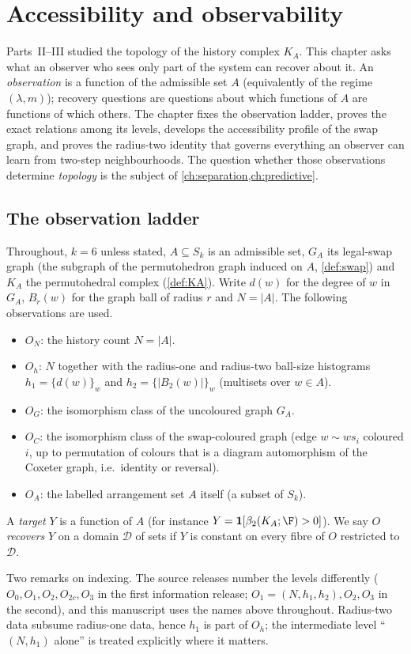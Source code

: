 \chapter{Accessibility and observability}\label{ch:access}

Parts~II--III studied the topology of the history complex $K_A$. This chapter asks what an observer who sees only part of the system can recover about it. An \emph{observation} is a function of the admissible set $A$ (equivalently of the regime $(\lambda,m)$); recovery questions are questions about which functions of $A$ are functions of which others. The chapter fixes the observation ladder, proves the exact relations among its levels, develops the accessibility profile of the swap graph, and proves the radius-two identity that governs everything an observer can learn from two-step neighbourhoods. The question whether those observations determine \emph{topology} is the subject of \cref{ch:separation,ch:predictive}.

\section{The observation ladder}\label{sec:ladder}
Throughout, $k=6$ unless stated, $A\subseteq S_k$ is an admissible set, $G_A$ its legal-swap graph (the subgraph of the permutohedron graph induced on $A$, \cref{def:swap}) and $K_A$ the permutohedral complex (\cref{def:KA}). Write $d(w)$ for the degree of $w$ in $G_A$, $B_r(w)$ for the graph ball of radius $r$ and $N=|A|$. The following observations are used.
\begin{definition}\label{def:ladder}
\begin{itemize}[nosep]
\item $O_N$: the history count $N=|A|$.
\item $O_h$: $N$ together with the radius-one and radius-two ball-size histograms $h_1=\{d(w)\}_w$ and $h_2=\{|B_2(w)|\}_w$ (multisets over $w\in A$).
\item $O_G$: the isomorphism class of the uncoloured graph $G_A$.
\item $O_C$: the isomorphism class of the swap-coloured graph (edge $w\sim ws_i$ coloured $i$, up to permutation of colours that is a diagram automorphism of the Coxeter graph, i.e.\ identity or reversal).
\item $O_A$: the labelled arrangement set $A$ itself (a subset of $S_k$).
\end{itemize}
A \emph{target} $Y$ is a function of $A$ (for instance $Y=\mathbf 1[\beta_2(K_A;\F)>0]$). We say $O$ \emph{recovers} $Y$ on a domain $\mathcal D$ of sets if $Y$ is constant on every fibre of $O$ restricted to $\mathcal D$.
\end{definition}
Two remarks on indexing. The source releases number the levels differently ($O_0,O_1,O_2,O_{2c},O_3$ in the first information release; $O_1=(N,h_1,h_2),O_2,O_3$ in the second), and this manuscript uses the names above throughout. Radius-two data subsume radius-one data, hence $h_1$ is part of $O_h$; the intermediate level ``$(N,h_1)$ alone'' is treated explicitly where it matters.


